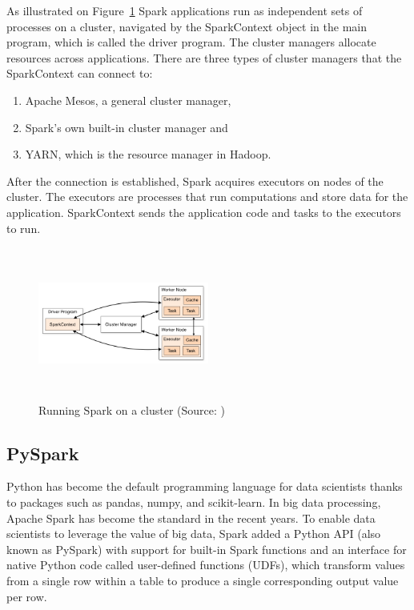 As illustrated on Figure~\ref{fig:spark-cluster} Spark applications run as independent sets of processes on a cluster, navigated by the SparkContext object in the main program, which is called the driver program. The cluster managers allocate resources across applications. There are three types of cluster managers that the SparkContext can connect to:
\begin{enumerate}
\item Apache Mesos, a general cluster manager, 
\item Spark's own built-in cluster manager and
\item YARN, which is the resource manager in Hadoop.
\end{enumerate}
After the connection is established, Spark acquires executors on nodes of the cluster. The executors are processes that run computations and store data for the application. SparkContext sends the application code and tasks to the executors to run.
\cite{spark-cluster}

\begin{figure}[h]
    \centering
    \includegraphics[width=0.5\textwidth, height=5cm]{images/cluster-overview}
    \caption{Running Spark on a cluster (Source: \cite{spark-cluster})}
    \label{fig:spark-cluster}
\end{figure}

\subsection{PySpark}
Python has become the default programming language for data scientists thanks to packages such as pandas, numpy, and scikit-learn. In big data processing, Apache Spark has become the standard in the recent years. To enable data scientists to leverage the value of big data, Spark added a Python API (also known as PySpark) with support for built-in Spark functions and an interface for native Python code called user-defined functions (UDFs), which transform values from a single row within a table to produce a single corresponding output value per row.

